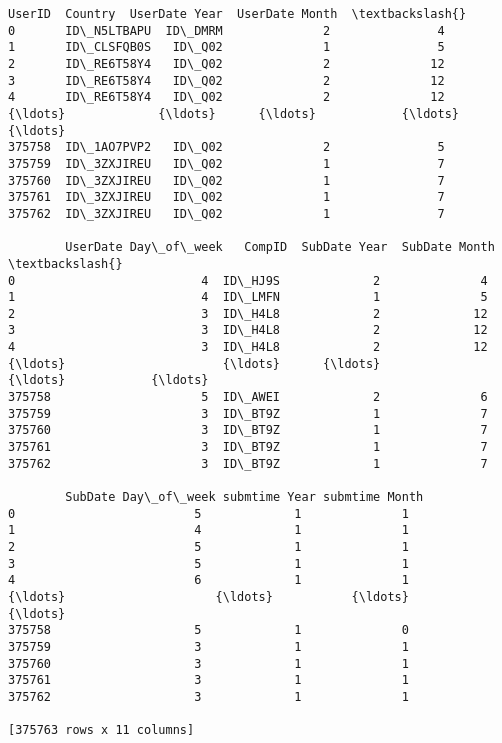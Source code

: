 \documentclass{report}
\makeatletter
\newcommand{\boxspacing}{\kern\kvtcb@left@rule\kern\kvtcb@boxsep}
\newcommand{\prompt}[4]{
        \ttfamily\llap{{\color{#2}[#3]:\hspace{3pt}#4}}\vspace{-\baselineskip}
    }
\makeatother
\begin{document}
            \begin{tcolorbox}[breakable, size=fbox, boxrule=.5pt, pad at break*=1mm, opacityfill=0]
\prompt{Out}{outcolor}{12}{\boxspacing}
\begin{Verbatim}[commandchars=\\\{\}]
             UserID  Country  UserDate Year  UserDate Month  \textbackslash{}
0       ID\_N5LTBAPU  ID\_DMRM              2               4
1       ID\_CLSFQB0S   ID\_Q02              1               5
2       ID\_RE6T58Y4   ID\_Q02              2              12
3       ID\_RE6T58Y4   ID\_Q02              2              12
4       ID\_RE6T58Y4   ID\_Q02              2              12
{\ldots}             {\ldots}      {\ldots}            {\ldots}             {\ldots}
375758  ID\_1AO7PVP2   ID\_Q02              2               5
375759  ID\_3ZXJIREU   ID\_Q02              1               7
375760  ID\_3ZXJIREU   ID\_Q02              1               7
375761  ID\_3ZXJIREU   ID\_Q02              1               7
375762  ID\_3ZXJIREU   ID\_Q02              1               7

        UserDate Day\_of\_week   CompID  SubDate Year  SubDate Month  \textbackslash{}
0                          4  ID\_HJ9S             2              4
1                          4  ID\_LMFN             1              5
2                          3  ID\_H4L8             2             12
3                          3  ID\_H4L8             2             12
4                          3  ID\_H4L8             2             12
{\ldots}                      {\ldots}      {\ldots}           {\ldots}            {\ldots}
375758                     5  ID\_AWEI             2              6
375759                     3  ID\_BT9Z             1              7
375760                     3  ID\_BT9Z             1              7
375761                     3  ID\_BT9Z             1              7
375762                     3  ID\_BT9Z             1              7

        SubDate Day\_of\_week submtime Year submtime Month
0                         5             1              1
1                         4             1              1
2                         5             1              1
3                         5             1              1
4                         6             1              1
{\ldots}                     {\ldots}           {\ldots}            {\ldots}
375758                    5             1              0
375759                    3             1              1
375760                    3             1              1
375761                    3             1              1
375762                    3             1              1

[375763 rows x 11 columns]
\end{Verbatim}
\end{tcolorbox}
        
\end{document}
